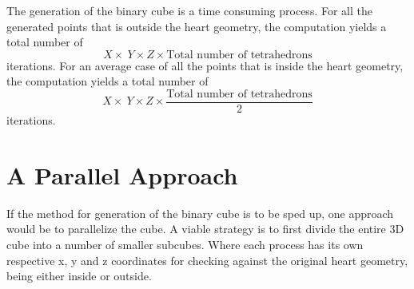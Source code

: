 The generation of the binary cube is a time consuming process. For all the generated points that is outside the heart geometry, the computation yields a total number of 
\begin{equation} 
X \times\ Y \times Z  \times \textrm{Total number of tetrahedrons}
\end{equation}  
iterations. For an average case of all the points that is inside the heart geometry, the computation yields a total number of 
\begin{equation} 
X \times\ Y \times Z  \times \frac{\textrm{Total number of tetrahedrons}}{2}
\end{equation} 
iterations.  

\section{A Parallel Approach}
If the method for generation of the binary cube is to be sped up, one approach would be to parallelize the cube. A viable strategy is to first divide the entire 3D cube into a number of smaller subcubes. Where each process has its own respective x, y and z coordinates for checking against the original heart geometry, being either inside or outside. 






